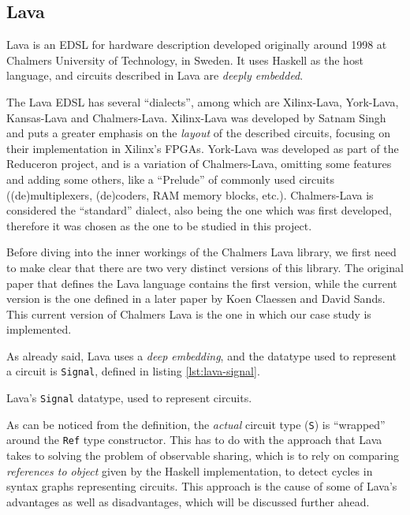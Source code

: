 \documentclass[a4paper]{article}
\begin{document}
        \subsection{Lava}
        \label{subsec:lava}
            Lava\cite{lava1998} is an EDSL for hardware description developed originally around 1998
            at Chalmers University of Technology, in Sweden. It uses Haskell as the host language,
            and circuits described in Lava are \emph{deeply embedded}.

            The Lava EDSL has several ``dialects'', among which are Xilinx-Lava, York-Lava,
            Kansas-Lava and Chalmers-Lava. Xilinx-Lava\cite{xilinx-lava} was developed by Satnam
            Singh and puts a greater emphasis on the \emph{layout} of the described circuits,
            focusing on their implementation in Xilinx's FPGAs. York-Lava was developed as part of
            the Reduceron\cite{reduceron} project, and is a variation of Chalmers-Lava, omitting
            some features and adding some others, like a ``Prelude'' of commonly used circuits
            ((de)multiplexers, (de)coders, RAM memory blocks, etc.). Chalmers-Lava is considered the
            ``standard'' dialect, also being the one which was first developed, therefore it was
            chosen as the one to be studied in this project.

            Before diving into the inner workings of the Chalmers Lava library, we first need to
            make clear that there are two very distinct versions of this library. The original paper
            that defines the Lava language\cite{lava1998} contains the first version, while the
            current version is the one defined in a later paper\cite{observable-sharing-1999} by
            Koen Claessen and David Sands. This current version of Chalmers Lava is the one in which
            our case study is implemented.

            As already said, Lava uses a \emph{deep embedding}, and the datatype used to represent a
            circuit is \texttt{Signal}, defined in listing \ref{lst:lava-signal}.

            \begin{listing}[h!]
                \caption{Lava's \texttt{Signal} datatype, used to represent circuits.
                    \label{lst:lava-signal}}
            \end{listing}

            As can be noticed from the definition, the \emph{actual} circuit type (\texttt{S}) is
            ``wrapped'' around the \texttt{Ref} type constructor. This has to do with the approach
            that Lava takes to solving the problem of observable sharing, which is to rely on
            comparing \emph{references to object} given by the Haskell implementation, to detect
            cycles in syntax graphs representing circuits. This approach is the cause of some of
            Lava's advantages as well as disadvantages, which will be discussed further ahead.
\end{document}
